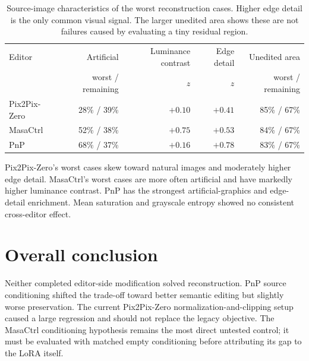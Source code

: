 \documentclass[10pt]{article}
\begin{document}
\begin{table}[htbp]
  \centering
  \small
  \setlength{\tabcolsep}{4pt}
  \begin{tabular}{lrrrr}
    \toprule
    Editor & Artificial & Luminance contrast & Edge detail & Unedited area \\
    & worst / remaining & $z$ & $z$ & worst / remaining \\
    \midrule
    Pix2Pix-Zero & 28\% / 39\% & $+0.10$ & $+0.41$ & 85\% / 67\% \\
    MasaCtrl     & 52\% / 38\% & $+0.75$ & $+0.53$ & 84\% / 67\% \\
    PnP          & 68\% / 37\% & $+0.16$ & $+0.78$ & 83\% / 67\% \\
    \bottomrule
  \end{tabular}
  \caption{Source-image characteristics of the worst reconstruction cases.
  Higher edge detail is the only common visual signal. The larger unedited area
  shows these are not failures caused by evaluating a tiny residual region.}
  \label{tab:worst-source-traits}
\end{table}

Pix2Pix-Zero's worst cases skew toward natural images and moderately higher
edge detail. MasaCtrl's worst cases are more often artificial and have markedly
higher luminance contrast. PnP has the strongest artificial-graphics and
edge-detail enrichment. Mean saturation and grayscale entropy showed no
consistent cross-editor effect.

\section*{Overall conclusion}

Neither completed editor-side modification solved reconstruction. PnP source
conditioning shifted the trade-off toward better semantic editing but slightly
worse preservation. The current Pix2Pix-Zero normalization-and-clipping setup
caused a large regression and should not replace the legacy objective. The
MasaCtrl conditioning hypothesis remains the most direct untested control; it
must be evaluated with matched empty conditioning before attributing its gap to
the LoRA itself.
\end{document}
